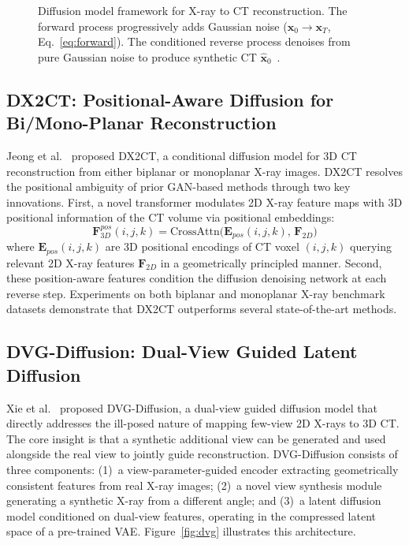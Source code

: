 \documentclass[10pt,twocolumn,a4paper]{article}
\begin{document}
\begin{figure}[t]
\caption{Diffusion model framework for X-ray to CT reconstruction. The forward
process progressively adds Gaussian noise ($\mathbf{x}_0 \rightarrow
\mathbf{x}_T$, Eq.~\ref{eq:forward}). The conditioned reverse process
denoises from pure Gaussian noise to produce synthetic CT
$\hat{\mathbf{x}}_0$~\cite{dx2ct,dvgdiffusion,yoon2024}.}
\label{fig:diffusion_overview}
\end{figure}

\subsection{DX2CT: Positional-Aware Diffusion for Bi/Mono-Planar Reconstruction}
\label{sec:diffusion:dx2ct}

Jeong et al.~\cite{dx2ct} proposed DX2CT, a conditional diffusion model for 3D
CT reconstruction from either biplanar or monoplanar X-ray images. DX2CT
resolves the positional ambiguity of prior GAN-based methods through two key
innovations. First, a novel transformer modulates 2D X-ray feature maps with 3D
positional information of the CT volume via positional embeddings:
\begin{equation}
\mathbf{F}_{3D}^{pos}(i,j,k) = \text{CrossAttn}\bigl(
\mathbf{E}_{pos}(i,j,k),\,\mathbf{F}_{2D}\bigr)
\label{eq:dx2ct}
\end{equation}
where $\mathbf{E}_{pos}(i,j,k)$ are 3D positional encodings of CT voxel
$(i,j,k)$ querying relevant 2D X-ray features $\mathbf{F}_{2D}$ in a
geometrically principled manner. Second, these position-aware features condition
the diffusion denoising network at each reverse step. Experiments on both
biplanar and monoplanar X-ray benchmark datasets demonstrate that DX2CT
outperforms several state-of-the-art methods.

\subsection{DVG-Diffusion: Dual-View Guided Latent Diffusion}
\label{sec:diffusion:dvg}

Xie et al.~\cite{dvgdiffusion} proposed DVG-Diffusion, a dual-view guided
diffusion model that directly addresses the ill-posed nature of mapping few-view
2D X-rays to 3D CT. The core insight is that a synthetic additional view can be
generated and used alongside the real view to jointly guide reconstruction.
DVG-Diffusion consists of three components: (1)~a view-parameter-guided encoder
extracting geometrically consistent features from real X-ray images;
(2)~a novel view synthesis module generating a synthetic X-ray from a different
angle; and (3)~a latent diffusion model conditioned on dual-view features,
operating in the compressed latent space of a pre-trained VAE. Figure~\ref{fig:dvg}
illustrates this architecture.
\end{document}
